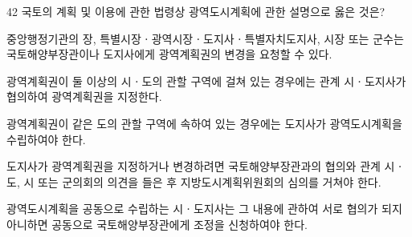 \begin{question}{42}
국토의 계획 및 이용에 관한 법령상 광역도시계획에 관한 설명으로 옳은 것은?
\begin{choices}
  \item 중앙행정기관의 장, 특별시장ㆍ광역시장ㆍ도지사ㆍ특별자치도지사, 시장 또는 군수는 국토해양부장관이나 도지사에게 광역계획권의 변경을 요청할 수 있다.
  \item 광역계획권이 둘 이상의 시ㆍ도의 관할 구역에 걸쳐 있는 경우에는 관계 시ㆍ도지사가 협의하여 광역계획권을 지정한다.
  \item 광역계획권이 같은 도의 관할 구역에 속하여 있는 경우에는 도지사가 광역도시계획을 수립하여야 한다.
  \item 도지사가 광역계획권을 지정하거나 변경하려면 국토해양부장관과의 협의와 관계 시ㆍ도, 시 또는 군의회의 의견을 들은 후 지방도시계획위원회의 심의를 거쳐야 한다.
  \item 광역도시계획을 공동으로 수립하는 시ㆍ도지사는 그 내용에 관하여 서로 협의가 되지 아니하면 공동으로 국토해양부장관에게 조정을 신청하여야 한다.
\end{choices}
\end{question}
